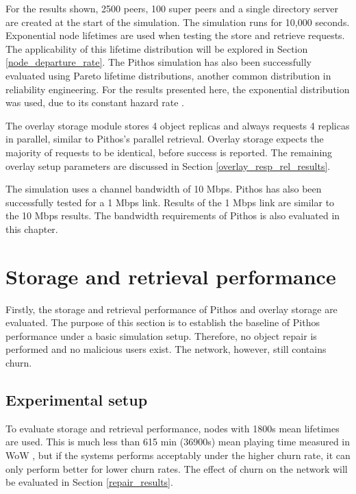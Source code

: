 For the results shown, 2500 peers, 100 super peers and a single directory server are created at the start of the simulation. The simulation runs for 10,000 seconds. Exponential node lifetimes are used when testing the store and retrieve requests. The applicability of this lifetime distribution will be explored in Section \ref{node_departure_rate}. The Pithos simulation has also been successfully evaluated using Pareto lifetime distributions, another common distribution in reliability engineering. For the results presented here, the exponential distribution was used, due to its constant hazard rate \cite{rausand2004systemreliability}.

The overlay storage module stores 4 object replicas and always requests 4 replicas in parallel, similar to Pithos's parallel retrieval. Overlay storage expects the majority of requests to be identical, before success is reported. The remaining overlay setup parameters are discussed in Section \ref{overlay_resp_rel_results}.

The simulation uses a channel bandwidth of 10 Mbps. Pithos has also been successfully tested for a 1 Mbps link. Results of the 1 Mbps link are similar to the 10 Mbps results. The bandwidth requirements of Pithos is also evaluated in this chapter.

\section{Storage and retrieval performance}

Firstly, the storage and retrieval performance of Pithos and overlay storage are evaluated. The purpose of this section is to establish the baseline of Pithos performance under a basic simulation setup. Therefore, no object repair is performed and no malicious users exist. The network, however, still contains churn.

\subsection{Experimental setup}
\label{store_retrieve_exp_setup}

To evaluate storage and retrieval performance, nodes with 1800s mean lifetimes are used. This is much less than 615 min (36900s) mean playing time measured in WoW \cite{wow_gameplay}, but if the systems performs acceptably under the higher churn rate, it can only perform better for lower churn rates. The effect of churn on the network will be evaluated in Section \ref{repair_results}.

